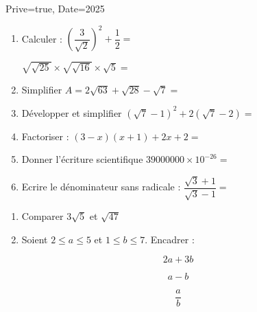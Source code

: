 \documentclass[a4paper,12pt]{article}
\begin{document}
\begin{Maquette}[Exam]{Prive=true, Date=2025}

\begin{exercice}[BaremeDetaille]
\begin{enumerate}
\item{} Calculer :\newline
$\left(\dfrac{3}{\sqrt{2}}\right)^{2}+\dfrac{1}{2}=$\anserline[1]

$\sqrt{\sqrt{25}}\times \sqrt{\sqrt{16}}\times\sqrt{5}=$
\anserline[2]
\item{} Simplifier \newline
$A=2\sqrt{63}+\sqrt{28}-\sqrt{7}=$\anserline[2]
\item{} Développer et simplifier\newline
 $\left(\sqrt{7}-1\right)^{2}+2(\sqrt{7}-2)=$\anserline[2]
 \item{} Factoriser :\newline
$(3-x)(x+1)+2x+2=$\anserline[2]
\item{}Donner l'écriture scientifique\newline
$39000000\times 10^{-26}=$\anserline[2]
\item{} Ecrire le dénominateur sans radicale :\newline
$\dfrac{\sqrt{3}+1}{\sqrt{3}-1}=$\anserline[2]
\end{enumerate}
\end{exercice}

\begin{exercice}[BaremeDetaille]
\begin{enumerate}
\item{} Comparer $3\sqrt{5}$ et $\sqrt{47}$\newline
\anserline[2]
\item{} Soient $2\leq a\leq 5$ et $1\leq b\leq 7$. Encadrer :
\end{enumerate}
\begin{minipage}{.3\linewidth}
$$2a+3b$$\newline\anserline[8]
\end{minipage}\hfill\vrule\hfill%
\begin{minipage}{.3\linewidth}
$$a-b$$\newline\anserline[8]
\end{minipage}\hfill\vrule\hfill%
\begin{minipage}{.3\linewidth}
$$\dfrac{a}{b}$$\newline\anserline[8]
\end{minipage}
\end{exercice}


\end{Maquette}
\end{document}
